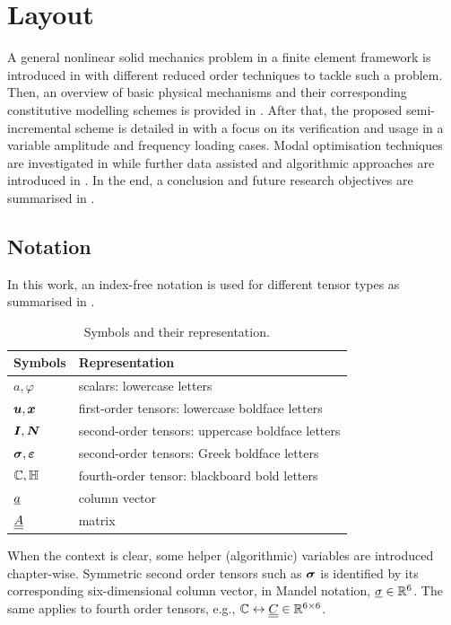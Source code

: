 \section{Layout}
A general nonlinear solid mechanics problem in a finite element framework is introduced in  with different reduced order techniques to tackle such a problem. Then, an overview of basic physical mechanisms and their corresponding constitutive modelling schemes is provided in . After that, the proposed semi-incremental scheme is detailed in  with a focus on its verification and usage in a variable amplitude and frequency loading cases. Modal optimisation techniques are investigated in  while further data assisted and algorithmic approaches are introduced in . In the end, a conclusion and future research objectives are summarised in .

\subsection{Notation}
In this work, an index-free notation is used for different tensor types as summarised in .
\begin{table}[hbt!]
	\caption{Symbols and their representation.}
	\label{tab_symbols}
	\centering
	\begin{tabular}{ll}
		\toprule
		\textbf{Symbols} & \textbf{Representation}                          \\
		\midrule
		$a,\varphi$      & scalars: lowercase letters                       \\
		$\mbox{$\bm  u$},\mbox{$\bm  x$}$        & first-order tensors: lowercase boldface letters  \\
		$\mbox{$\bm  I$},\mbox{$\bm  N$}$        & second-order tensors: uppercase boldface letters \\
		$\mbox{$\bm \sigma$},\mbox{$\bm \varepsilon $}$  & second-order tensors: Greek boldface letters     \\
		${\mathbb{ C}},{\mathbb{ H}}$      & fourth-order tensor: blackboard bold letters     \\
		$\underline{a}$            & column vector                                    \\
		$\underline{\underline{A}}$            & matrix                                           \\
		\bottomrule
	\end{tabular}
\end{table}
When the context is clear, some helper (algorithmic) variables are introduced chapter-wise. Symmetric second order tensors such as $\mbox{$\bm \sigma$}$ is identified by its corresponding six-dimensional column vector, in Mandel notation, $\underline{\sigma} \in {\mathbb{ R}}^6$. The same applies to fourth order tensors, e.g., ${\mathbb{ C}} \leftrightarrow \underline{\underline{C}} \in {\mathbb{ R}}^{6 \times 6}$.

